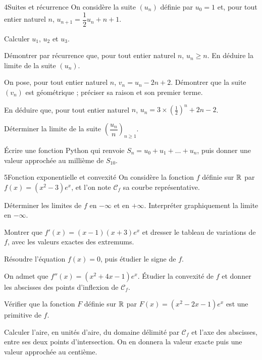 \begin{exoBac}{4}{Suites et récurrence}
On considère la suite $(u_n)$ définie par $u_0=1$ et, pour tout entier naturel $n$, $u_{n+1}=\dfrac12u_n+n+1$.
\begin{questions}
  \item Calculer $u_1$, $u_2$ et $u_3$.
  \item Démontrer par récurrence que, pour tout entier naturel $n$, $u_n\geq n$. En déduire la limite de la suite $(u_n)$.
  \item On pose, pour tout entier naturel $n$, $v_n=u_n-2n+2$. Démontrer que la suite $(v_n)$ est géométrique ; préciser sa raison et
    son premier terme.
  \item En déduire que, pour tout entier naturel $n$, $u_n=3\times\left(\frac12\right)^{n}+2n-2$.
  \item Déterminer la limite de la suite $\left(\dfrac{u_n}{n}\right)_{n\geq1}$.
  \item Écrire une fonction Python  qui renvoie $S_n=u_0+u_1+\dots+u_n$, puis donner une valeur approchée au millième de
    $S_{10}$.
\end{questions}
\end{exoBac}

\begin{exoBac}{5}{Fonction exponentielle et convexité}
On considère la fonction $f$ définie sur $\mathbb{R}$ par $f(x)=\left(x^{2}-3\right)e^{x}$, et l'on note $\mathcal{C}_f$ sa courbe représentative.
\begin{questions}
  \item Déterminer les limites de $f$ en $-\infty$ et en $+\infty$. Interpréter graphiquement la limite en $-\infty$.
  \item Montrer que $f'(x)=(x-1)(x+3)e^{x}$ et dresser le tableau de variations de $f$, avec les valeurs exactes des extremums.
  \item Résoudre l'équation $f(x)=0$, puis étudier le signe de $f$.
\end{questions}
\begin{questions}[resume]
  \item On admet que $f''(x)=\left(x^{2}+4x-1\right)e^{x}$. Étudier la convexité de $f$ et donner les abscisses des points d'inflexion de
    $\mathcal{C}_f$.
  \item Vérifier que la fonction $F$ définie sur $\mathbb{R}$ par $F(x)=\left(x^{2}-2x-1\right)e^{x}$ est une primitive de $f$.
  \item Calculer l'aire, en unités d'aire, du domaine délimité par $\mathcal{C}_f$ et l'axe des abscisses, entre ses deux points
    d'intersection. On en donnera la valeur exacte puis une valeur approchée au centième.
\end{questions}
\end{exoBac}

